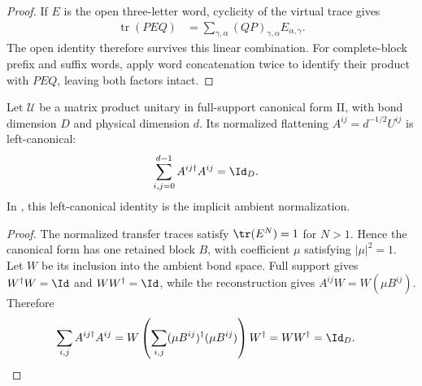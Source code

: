 \begin{proof}\leanok
    If $E$ is the open three-letter word, cyclicity of the virtual trace
    gives
    \begin{align}
        \operatorname{tr}(PEQ)
         & =\sum_{\gamma,\alpha}
        (QP)_{\gamma,\alpha}E_{\alpha,\gamma}.
    \end{align}
    The open identity therefore survives this linear combination. For
    complete-block prefix and suffix words, apply word concatenation twice
    to identify their product with $PEQ$, leaving both factors intact.
\end{proof}

\begin{lemma}
    \label{thm:mpu_cfii_left_canonical}
    \leanok
    Let $\mathcal U$ be a matrix product unitary in full-support canonical
    form II, with bond dimension $D$ and physical dimension $d$. Its normalized
    flattening $A^{ij}=d^{-1/2}U^{ij}$ is left-canonical:
    \begin{align}
        \sum_{i,j=0}^{d-1} A^{ij\dagger}A^{ij} & =\Id_D.
    \end{align}
    In \cite[lines 269--281 and 344--356]{Cirac2017MPU}, this left-canonical identity is the implicit ambient
    normalization.
\end{lemma}

\begin{proof}\leanok
    The normalized transfer traces satisfy $\tr(E^N)=1$ for $N>1$. Hence the
    canonical form has one retained block $B$, with coefficient $\mu$
    satisfying $|\mu|^2=1$. Let $W$ be its inclusion into the ambient bond
    space. Full support gives $W^\dagger W=\Id$ and $WW^\dagger=\Id$, while
    the reconstruction gives $A^{ij}W=W(\mu B^{ij})$. Therefore
    \begin{align}
        \sum_{i,j}A^{ij\dagger}A^{ij}
         & =W\left(\sum_{i,j}(\mu B^{ij})^\dagger(\mu B^{ij})\right)W^\dagger
        =WW^\dagger=\Id_D.
    \end{align}
\end{proof}

